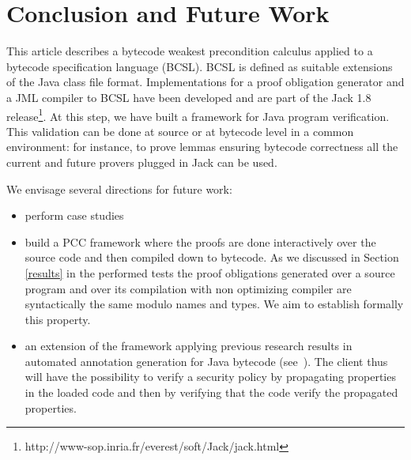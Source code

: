 \section{Conclusion and Future Work}\label{conclusion}
This article describes a bytecode weakest precondition calculus applied to a bytecode specification language (BCSL).
BCSL is defined as suitable extensions of the Java class file format.
Implementations for a proof obligation generator and a JML compiler to BCSL have been developed and are part of the Jack 1.8 release\footnote{http://www-sop.inria.fr/everest/soft/Jack/jack.html}.
At this step, we have built a framework for Java program verification. This validation can be done at source or at bytecode level in a common environment: for instance, to prove lemmas ensuring bytecode correctness all the current and future provers plugged in Jack can be used.


 We envisage several directions for future work:
\begin{itemize}
  \item perform case studies
  \item  build a PCC framework where the proofs are done interactively over the source code
and then compiled down to bytecode. As we discussed in Section \ref{results} in the performed tests the 
proof obligations generated over a source program and over its compilation with non optimizing compiler are
 syntactically the same modulo names and types. We aim to establish formally this property.  
  \item an extension of the framework applying previous research results in automated annotation generation for Java bytecode (see~\cite{PBBHL}). The client thus will have the possibility to verify a security policy by propagating properties in the loaded code and then by verifying that the code verify the propagated properties.

\end{itemize}



